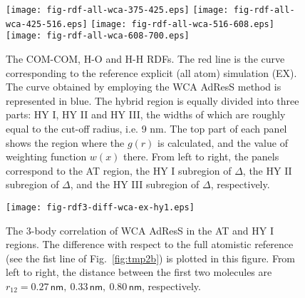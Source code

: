 \documentclass[aps,a4paper,reprint,onecolumn]{revtex4}
\begin{document}
\begin{figure}
  \centering
  \texttt{[image: fig-rdf-all-wca-375-425.eps]}
  \texttt{[image: fig-rdf-all-wca-425-516.eps]}
  \texttt{[image: fig-rdf-all-wca-516-608.eps]}
  \texttt{[image: fig-rdf-all-wca-608-700.eps]}
  \caption{
    The COM-COM, H-O and H-H RDFs. 
    The red line is the curve corresponding to the reference explicit (all atom)
    simulation (EX).
    The curve obtained by employing the WCA AdResS 
    method is represented in blue.
    The hybrid region is equally
    divided into three parts: HY I, HY II and HY III, the widths of
    which are roughly equal to the cut-off radius, i.e. 9 \textsf{nm}.    
    The top part of each panel shows the region where the $g(r)$ is calculated,
    and the value of weighting function $w(x)$ there.
    From left to right, the panels correspond to the AT region, 
    the HY I subregion of $\Delta$,
    the HY II subregion of $\Delta$,
    and the HY III subregion of $\Delta$, respectively. 
  }
  \label{fig:wca-dist}
\end{figure}

\begin{figure}
  \centering
  \texttt{[image: fig-rdf3-diff-wca-ex-hy1.eps]}
  \caption{The 3-body correlation of WCA AdResS in the AT
    and HY I regions.
    The difference with respect to the full atomistic reference
    (see the fist line of Fig.~\ref{fig:tmp2b})
    is plotted in this figure. From left to right, the distance
    between the first two molecules are $r_{12} =
    0.27\,\textsf{nm},\ 0.33\,\textsf{nm},\  
    0.80\,\textsf{nm}$, respectively.
  }
  \label{fig:wca-g3}
\end{figure}
\end{document}
